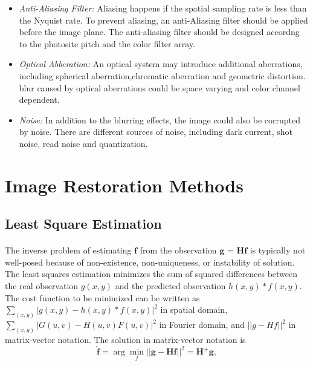 \documentclass[a4paper]{book}
\begin{document}
\begin{itemize}
		\item \textit{Anti-Aliasing Filter:} Aliasing happens if the spatial sampling rate is less than the Nyquist rate. To prevent aliasing, an anti-Aliasing filter should be applied before the image plane. The anti-aliasing filter should be designed accordng to the photosite pitch and the color filter array.
		\item \textit{Optical Abberation:} An optical system may introduce additional aberrations, including spherical aberration,chromatic aberration and geometric distortion. blur caused by optical aberrations could be space varying and color channel dependent.
		\item \textit{Noise:} In addition to the blurring effects, the image could also be corrupted by noise. There are different sources of noise, including dark current, shot noise, read noise and quantization.
	\end{itemize}
	

	\section{\Large Image Restoration Methods}\label{secIR}
	
	\subsection{Least Square Estimation}
	\paragraph*{}The inverse problem of estimating $ \textbf{f} $ from the observation $ \textbf{g = Hf} $ is typically not well-posed because of non-existence, non-uniqueness, or instability of solution. The least squares estimation minimizes the sum of squared differences between the real observation $ g(x,y) $ and the predicted observation $ h(x,y) \ast f(x,y) $. The cost function to be minimized can be written as $ \sum_{(x,y)} |g(x,y)-h(x,y)\ast f(x,y)|^{2}$ in spatial domain, $ \sum_{(x,y)} |G(u,v)-H(u,v)F(u,v)|^{2} $ in Fourier domain, and $ ||g - Hf||^{2} $ in matrix-vector notation.\cite{Fletcher00opt} The solution in matrix-vector notation is 
\begin{equation}
\label{eq3.4}
\hat{\textbf{f}} = \arg\min_{f} ||\textbf{g} - \textbf{Hf}||^{2} = \textbf{H}^{+}\textbf{g},
\end{equation}
\end{document}
